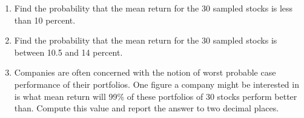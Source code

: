 \begin{enumerate}
\begin{enumerate}



\item  Find the probability that the mean return for the 30 sampled
stocks is less than 10 percent.\\


\item Find the probability that the mean return for the 30 sampled
stocks is between 10.5 and 14 percent.

\item Companies are often concerned with the notion of worst probable case performance of their portfolios. One figure a company might be interested in is what mean return will 99\% of these portfolios of 30 stocks perform better than. Compute this value and report the answer to two decimal places.

\end{enumerate}
\end{enumerate}

